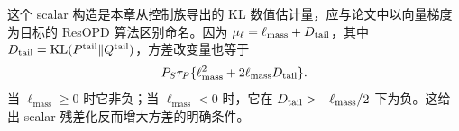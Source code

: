 这个 scalar 构造是本章从控制族导出的 KL 数值估计量，应与论文中以向量梯度为目标的 ResOPD 算法区别命名。因为 $\mu_\ell=\ell_{\mathrm{mass}}+D_{\mathrm{tail}}$，其中 $D_{\mathrm{tail}}=\operatorname{KL}(P^{\mathrm{tail}}\Vert Q^{\mathrm{tail}})$，方差改变量也等于
\begin{equation*}
 P_S\tau_P\{\ell_{\mathrm{mass}}^2+2\ell_{\mathrm{mass}}D_{\mathrm{tail}}\}.
\end{equation*}
当 $\ell_{\mathrm{mass}}\geq0$ 时它非负；当 $\ell_{\mathrm{mass}}<0$ 时，它在 $D_{\mathrm{tail}}>-\ell_{\mathrm{mass}}/2$ 下为负。这给出 scalar 残差化反而增大方差的明确条件。
